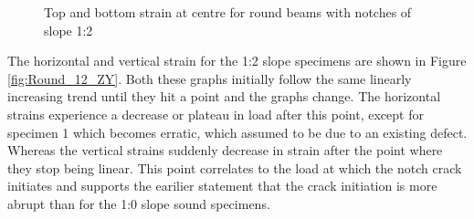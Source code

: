\documentclass[11pt,a4paper]{article}
\numberwithin{equation}{subsection}
\begin{document}
\vspace*{\baselineskip}

\begin{figure}[h]
	\begin{center}
	\end{center}
	\caption{Top and bottom strain at centre for round beams with notches of slope 1:2}
	\label{fig:Round_12_Centre}
\end{figure}
\pagebreak

\noindent
The horizontal and vertical strain for the 1:2 slope specimens are shown in Figure \ref{fig:Round_12_ZY}. Both these graphs initially follow the same linearly increasing trend until they hit a point and the graphs change. The horizontal strains experience a decrease or plateau in load after this point, except for specimen 1 which becomes erratic, which assumed to be due to an existing defect. Whereas the vertical strains suddenly decrease in strain after the point where they stop being linear. This point correlates to the load at which the notch crack initiates and supports the earilier statement that the crack initiation is more abrupt than for the 1:0 slope sound specimens. 

\vspace*{\baselineskip}
\end{document}
